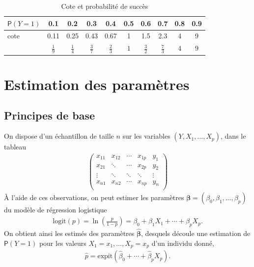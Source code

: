 \documentclass[
  11pt,
  letterpaper,
]{book}
\theoremstyle{definition}
\theoremstyle{definition}
\theoremstyle{definition}
\theoremstyle{remark}
\begin{document}
\begin{table}

\caption{\label{tab:03-cotes}Cote et probabilité de succès}
\centering
\begin{tabular}[t]{lccccccccc}
\toprule
${\mathsf P}\left(Y=1\right)$ & 0.1 & 0.2 & 0.3 & 0.4 & 0.5 & 0.6 & 0.7 & 0.8 & 0.9\\
\midrule
cote & 0.11 & 0.25 & 0.43 & 0.67 & 1 & 1.5 & 2.3 & 4 & 9\\
 & $\frac{1}{9}$ & $\frac{1}{4}$ & $\frac{3}{7}$ & $\frac{2}{3}$ & $1$ & $\frac{3}{2}$ & $\frac{7}{3}$ & $4$ & $9$\\
\bottomrule
\end{tabular}
\end{table}

\hypertarget{estimation-des-paramuxe8tres}{%
\section{Estimation des paramètres}\label{estimation-des-paramuxe8tres}}

\hypertarget{principes-de-base}{%
\subsection{Principes de base}\label{principes-de-base}}

On dispose d'un échantillon de taille \(n\) sur les variables \((Y, X_1, \ldots, X_p)\), dans le tableau
\begin{align*}
 \begin{pmatrix}
 x_{11} & x_{12} & \cdots & x_{1p} & y_1 \\
 x_{21} & \ddots & \cdots & x_{2p} & y_2 \\
 \vdots & \ddots & \ddots & \ddots & \vdots \\
 x_{n1} & x_{n2} & \cdots & x_{np} & y_n \\
 \end{pmatrix}
\end{align*}
À l'aide de ces observations, on peut estimer les paramètres \(\boldsymbol{\beta} = (\beta_0, \beta_1 ,\ldots, \beta_p)\) du modèle de régression logistique
\begin{align*}
\mathrm{logit}(p) = \ln \left( \frac{p}{1-p}\right) = \beta_0 + \beta_1 X_1 + \cdots + \beta_pX_p.
\end{align*}
On obtient ainsi les estimés des paramètres \(\widehat{\boldsymbol{\beta}}\), desquels découle une estimation de \({\mathsf P}\left(Y=1\right)\) pour les valeurs \(X_1=x_1, \ldots, X_p=x_p\) d'un individu donné,
\begin{align*}
 \widehat{p} = \mathrm{expit}(\widehat{\beta}_0 + \cdots + \widehat{\beta}_pX_p).
\end{align*}
\end{document}
